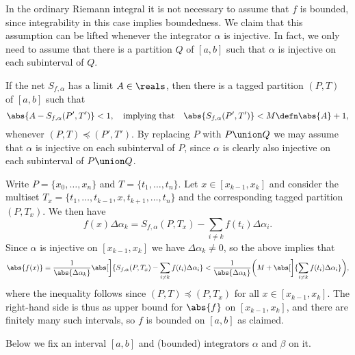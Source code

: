 \documentclass[article, a4paper, 11pt, oneside]{memoir}
\numberwithin{equation}{chapter}
\begin{document}
\begin{remark}
    In the ordinary Riemann integral it is not necessary to assume that $f$ is bounded, since integrability in this case implies boundedness. We claim that this assumption can be lifted whenever the integrator $\alpha$ is injective. In fact, we only need to assume that there is a partition $Q$ of $[a,b]$ such that $\alpha$ is injective on each subinterval of $Q$.
    
    If the net $S_{f,\alpha}$ has a limit $A \in \reals$, then there is a tagged partition $(P,T)$ of $[a,b]$ such that
    \begin{equation*}
        \abs{A - S_{f,\alpha}(P',T')} < 1,
        \quad \text{implying that} \quad
        \abs{S_{f,\alpha}(P',T')} < M \defn \abs{A} + 1,
    \end{equation*}
    whenever $(P,T) \preceq (P',T')$. By replacing $P$ with $P \union Q$ we may assume that $\alpha$ is injective on each subinterval of $P$, since $\alpha$ is clearly also injective on each subinterval of $P \union Q$.
    
    Write $P = \{x_0, \ldots, x_n\}$ and $T = \{t_1, \ldots, t_n\}$. Let $x \in [x_{k-1},x_k]$ and consider the multiset $T_x = \{t_1, \ldots, t_{k-1}, x, t_{k+1}, \ldots, t_n\}$ and the corresponding tagged partition $(P,T_x)$. We then have
    \begin{equation*}
        f(x) \Delta \alpha_k
            = S_{f,\alpha}(P,T_x) - \sum_{i \neq k} f(t_i) \Delta \alpha_i.
    \end{equation*}
    Since $\alpha$ is injective on $[x_{k-1},x_k]$ we have $\Delta\alpha_k \neq 0$, so the above implies that
    \begin{equation*}
        \abs{f(x)}
            = \frac{1}{\abs{\Delta \alpha_k}} \abs[\bigg]{ S_{f,\alpha}(P,T_x) - \sum_{i \neq k} f(t_i) \Delta \alpha_i }
            < \frac{1}{\abs{\Delta \alpha_k}} \biggl( M + \abs[\bigg]{ \sum_{i \neq k} f(t_i) \Delta \alpha_i } \biggr),
    \end{equation*}
    where the inequality follows since $(P,T) \preceq (P,T_x)$ for all $x \in [x_{k-1},x_k]$. The right-hand side is thus as upper bound for $\abs{f}$ on $[x_{k-1},x_k]$, and there are finitely many such intervals, so $f$ is bounded on $[a,b]$ as claimed.
\end{remark}

Below we fix an interval $[a,b]$ and (bounded) integrators $\alpha$ and $\beta$ on it.
\end{document}
